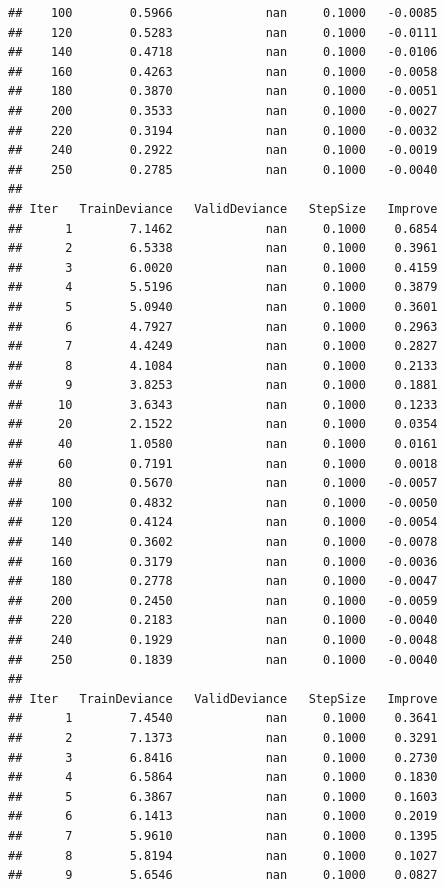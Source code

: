 \documentclass[]{book}
\begin{document}
\begin{verbatim}
##    100        0.5966             nan     0.1000   -0.0085
##    120        0.5283             nan     0.1000   -0.0111
##    140        0.4718             nan     0.1000   -0.0106
##    160        0.4263             nan     0.1000   -0.0058
##    180        0.3870             nan     0.1000   -0.0051
##    200        0.3533             nan     0.1000   -0.0027
##    220        0.3194             nan     0.1000   -0.0032
##    240        0.2922             nan     0.1000   -0.0019
##    250        0.2785             nan     0.1000   -0.0040
## 
## Iter   TrainDeviance   ValidDeviance   StepSize   Improve
##      1        7.1462             nan     0.1000    0.6854
##      2        6.5338             nan     0.1000    0.3961
##      3        6.0020             nan     0.1000    0.4159
##      4        5.5196             nan     0.1000    0.3879
##      5        5.0940             nan     0.1000    0.3601
##      6        4.7927             nan     0.1000    0.2963
##      7        4.4249             nan     0.1000    0.2827
##      8        4.1084             nan     0.1000    0.2133
##      9        3.8253             nan     0.1000    0.1881
##     10        3.6343             nan     0.1000    0.1233
##     20        2.1522             nan     0.1000    0.0354
##     40        1.0580             nan     0.1000    0.0161
##     60        0.7191             nan     0.1000    0.0018
##     80        0.5670             nan     0.1000   -0.0057
##    100        0.4832             nan     0.1000   -0.0050
##    120        0.4124             nan     0.1000   -0.0054
##    140        0.3602             nan     0.1000   -0.0078
##    160        0.3179             nan     0.1000   -0.0036
##    180        0.2778             nan     0.1000   -0.0047
##    200        0.2450             nan     0.1000   -0.0059
##    220        0.2183             nan     0.1000   -0.0040
##    240        0.1929             nan     0.1000   -0.0048
##    250        0.1839             nan     0.1000   -0.0040
## 
## Iter   TrainDeviance   ValidDeviance   StepSize   Improve
##      1        7.4540             nan     0.1000    0.3641
##      2        7.1373             nan     0.1000    0.3291
##      3        6.8416             nan     0.1000    0.2730
##      4        6.5864             nan     0.1000    0.1830
##      5        6.3867             nan     0.1000    0.1603
##      6        6.1413             nan     0.1000    0.2019
##      7        5.9610             nan     0.1000    0.1395
##      8        5.8194             nan     0.1000    0.1027
##      9        5.6546             nan     0.1000    0.0827

\end{verbatim}
\end{document}
